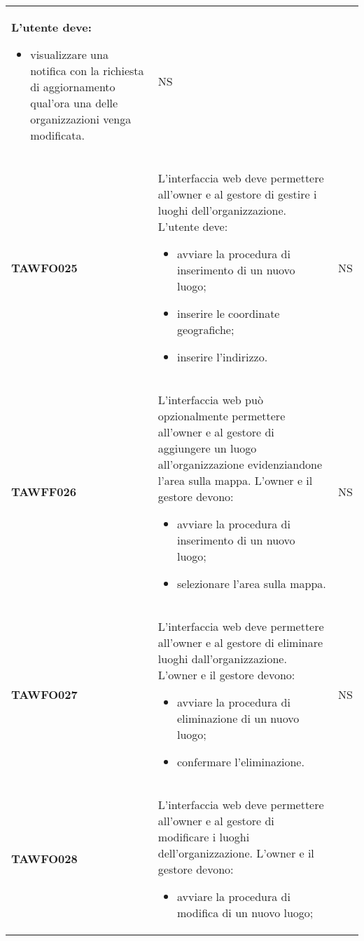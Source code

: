 \documentclass[../piano-di-qualifica.tex]{subfiles}
\begin{document}
\begin{centering}
\begin{longtable}[H]{>{\centering\bfseries}m{3cm} >{}p{10cm} >{\centering\arraybackslash}m{3cm}}
        L’utente deve: 
        \begin{itemize} 
         \item visualizzare una notifica con la richiesta di aggiornamento qual'ora una delle organizzazioni venga modificata.
        \end{itemize}
        & NS \\
        TAWFO025      & L’interfaccia web deve permettere all’owner e al gestore di gestire i luoghi dell’organizzazione.         \newline
        L’utente deve: 
        \begin{itemize} 
         \item avviare la procedura di inserimento di un nuovo luogo;
         \item inserire le coordinate geografiche;
         \item inserire l'indirizzo.
        \end{itemize}
        & NS \\
        TAWFF026      & L’interfaccia web può opzionalmente permettere all’owner e al
        gestore di aggiungere un luogo all’organizzazione evidenziandone
        l’area sulla mappa. \newline
        L’owner e il gestore devono: 
        \begin{itemize} 
         \item avviare la procedura di inserimento di un nuovo luogo;
         \item selezionare l'area sulla mappa.
        \end{itemize}
        & NS \\
        TAWFO027      & L’interfaccia web deve permettere all’owner e al gestore di eliminare luoghi dall’organizzazione. \newline
        L’owner e il gestore devono: 
        \begin{itemize} 
         \item avviare la procedura di eliminazione di un nuovo luogo;
         \item confermare l'eliminazione.
        \end{itemize}
        & NS \\
        TAWFO028      & L’interfaccia web deve permettere all’owner e al gestore di modificare i luoghi dell’organizzazione. \newline
        L’owner e il gestore devono: 
        \begin{itemize} 
         \item avviare la procedura di modifica di un nuovo luogo;

\end{itemize}
\end{longtable}
\end{centering}
\end{document}
